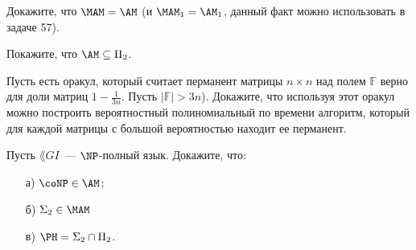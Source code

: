 \begin{ptask}{65}
    Докажите, что $\MAM = \AM$ (и $\MAM_1 = \AM_1$, данный факт можно использовать в задаче 57).
\end{ptask}

\begin{ptask}{66}
    Покажите, что $\AM \subseteq \Pi_2$.
\end{ptask}

\begin{ptask}{67}
    Пусть есть оракул, который считает перманент матрицы $n \times n$ над полем $\mathbb{F}$ верно для доли матриц
    $1 - \frac{1}{3n}$. Пусть $|\mathbb{F}| > 3n$). Докажите, что используя этот оракул можно построить вероятностный
    полиномиальный по времени алгоритм, который для каждой матрицы с большой вероятностью находит ее перманент.
\end{ptask}


\begin{ptask}{69}
    Пусть $\lang{GI}$~--- $\NP$-полный язык. Докажите, что:
    \begin{enumerate}[topsep = 0pt, itemsep = -1ex]
        \item [а)] $\coNP \in \AM$;
        \item [б)] $\Sigma_2 \in \MAM$
        \item [в)] $\PH = \Sigma_2 \cap \Pi_2$.
    \end{enumerate}
\end{ptask}
